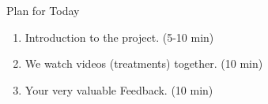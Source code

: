 \documentclass{beamer}
\begin{document}
%
%
%
\begin{frame}{Plan for Today}
    \begin{enumerate}
        \item Introduction to the project. (5-10 min)
        \vspace{0.5em}
        \item We watch videos (treatments) together. (10 min)
        \vspace{0.5em}
        \item Your very valuable Feedback. (10 min)
    \end{enumerate}
\end{frame}
\end{document}
